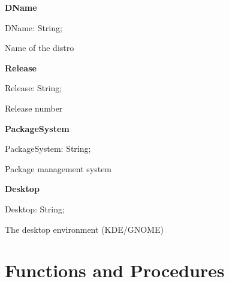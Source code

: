 \documentclass{report}
\newif\ifpdf
\begin{document}
\begin{list}{}{
\setlength{\itemindent}{0cm}
\setlength{\listparindent}{0cm}
\setlength{\leftmargin}{\evensidemargin}
\addtolength{\leftmargin}{\tmplength}
\settowidth{\labelsep}{X}
\addtolength{\leftmargin}{\labelsep}
\setlength{\labelwidth}{\tmplength}
}
\label{distri.TDistroInfo-DName}
\item[\textbf{DName}\hfill]
\ifpdf
\begin{flushleft}
\fi
\begin{ttfamily}
DName: String;\end{ttfamily}

\ifpdf
\end{flushleft}
\fi


\par Name of the distro\label{distri.TDistroInfo-Release}
\item[\textbf{Release}\hfill]
\ifpdf
\begin{flushleft}
\fi
\begin{ttfamily}
Release: String;\end{ttfamily}

\ifpdf
\end{flushleft}
\fi


\par Release number\label{distri.TDistroInfo-PackageSystem}
\item[\textbf{PackageSystem}\hfill]
\ifpdf
\begin{flushleft}
\fi
\begin{ttfamily}
PackageSystem: String;\end{ttfamily}

\ifpdf
\end{flushleft}
\fi


\par Package management system\label{distri.TDistroInfo-Desktop}
\item[\textbf{Desktop}\hfill]
\ifpdf
\begin{flushleft}
\fi
\begin{ttfamily}
Desktop: String;\end{ttfamily}

\ifpdf
\end{flushleft}
\fi


\par The desktop environment (KDE/GNOME)\end{list}
\section{Functions and Procedures}
\ifpdf
\end{document}
